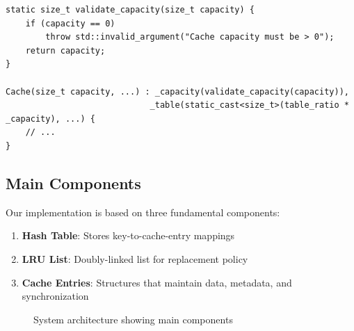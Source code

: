 \documentclass[11pt,a4paper]{article}
\begin{document}
\begin{lstlisting}[caption=Capacity validation in constructor]
static size_t validate_capacity(size_t capacity) {
    if (capacity == 0)
        throw std::invalid_argument("Cache capacity must be > 0");
    return capacity;
}

Cache(size_t capacity, ...) : _capacity(validate_capacity(capacity)), 
                             _table(static_cast<size_t>(table_ratio * _capacity), ...) {
    // ...
}
\end{lstlisting}

\subsection{Main Components}

Our implementation is based on three fundamental components:

\begin{enumerate}
\item \textbf{Hash Table}: Stores key-to-cache-entry mappings
\item \textbf{LRU List}: Doubly-linked list for replacement policy
\item \textbf{Cache Entries}: Structures that maintain data, metadata,
      and synchronization
\end{enumerate}

\begin{figure}[htbp]
\centering
{}
\caption{System architecture showing main components}
\end{figure}
\end{document}
